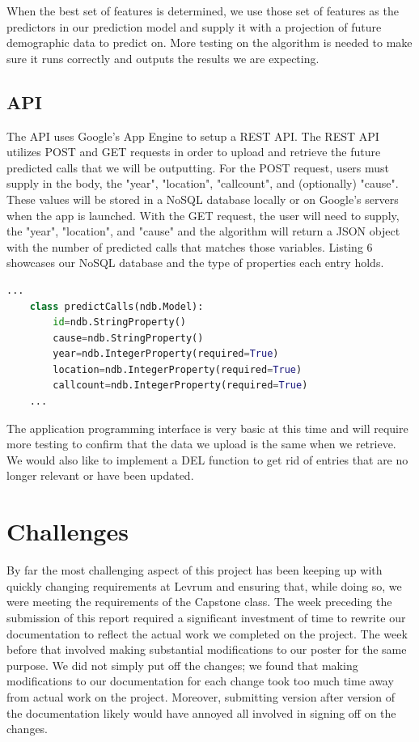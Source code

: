 \documentclass[onecolumn, draftclsnofoot,10pt, compsoc]{IEEEtran}
\begin{document}
\begin{singlespace}
When the best set of features is determined, we use those set of features as the predictors in our prediction model and supply it with a projection of future demographic data to predict on.
More testing on the algorithm is needed to make sure it runs correctly and outputs the results we are expecting.

\subsection{API} \label{api}

The API uses Google's App Engine to setup a REST API.
The REST API utilizes POST and GET requests in order to upload and retrieve the future predicted calls that we will be outputting.
For the POST request, users must supply in the body, the "year", "location", "callcount", and (optionally) "cause".
These values will be stored in a NoSQL database locally or on Google's servers when the app is launched. 
With the GET request, the user will need to supply, the "year", "location", and "cause" and the algorithm will return a JSON object with the number of predicted calls that matches those variables.
Listing 6 showcases our NoSQL database and the type of properties each entry holds.

\begin{lstlisting}[language=Python, caption={API NoSQL database.}, label={lst:API}, captionpos=b]
    ...
    class predictCalls(ndb.Model):
	    id=ndb.StringProperty()
	    cause=ndb.StringProperty()
	    year=ndb.IntegerProperty(required=True)
	    location=ndb.IntegerProperty(required=True)
	    callcount=ndb.IntegerProperty(required=True)
    ...
\end{lstlisting}

The application programming interface is very basic at this time and will require more testing to confirm that the data we upload is the same when we retrieve.
We would also like to implement a DEL function to get rid of entries that are no longer relevant or have been updated.

\section{Challenges} \label{challenges}
By far the most challenging aspect of this project has been keeping up with quickly changing requirements at Levrum and ensuring that, while doing so, we were meeting the requirements of the Capstone class. The week preceding the submission of this report required a significant investment of time to rewrite our documentation to reflect the actual work we completed on the project. The week before that involved making substantial modifications to our poster for the same purpose. We did not simply put off the changes; we found that making modifications to our documentation for each change took too much time away from actual work on the project. Moreover, submitting version after version of the documentation likely would have annoyed all involved in signing off on the changes.


\end{singlespace}
\end{document}
